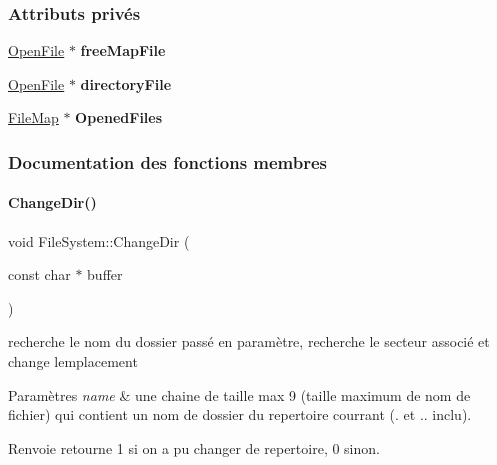 \subsubsection*{Attributs privés}
\begin{DoxyCompactItemize}
\item 
\hypertarget{class_file_system_ac011f3b710a3b03d29fb9e554008699d}{}\label{class_file_system_ac011f3b710a3b03d29fb9e554008699d} 
\hyperlink{class_open_file}{Open\+File} $\ast$ {\bfseries free\+Map\+File}
\item 
\hypertarget{class_file_system_a8d062da5905bf0eca01033ad70d0e2d5}{}\label{class_file_system_a8d062da5905bf0eca01033ad70d0e2d5} 
\hyperlink{class_open_file}{Open\+File} $\ast$ {\bfseries directory\+File}
\item 
\hypertarget{class_file_system_a02aaa8b1bdbe6f73e3058a0ccea2172c}{}\label{class_file_system_a02aaa8b1bdbe6f73e3058a0ccea2172c} 
\hyperlink{class_file_map}{File\+Map} $\ast$ {\bfseries Opened\+Files}
\end{DoxyCompactItemize}


\subsubsection{Documentation des fonctions membres}
\hypertarget{class_file_system_ab60a0afd7904cc1826d6964e4d6025e2}{}\label{class_file_system_ab60a0afd7904cc1826d6964e4d6025e2} 
\paragraph{\texorpdfstring{Change\+Dir()}{ChangeDir()}}
{\footnotesize\ttfamily void File\+System\+::\+Change\+Dir (\begin{DoxyParamCaption}\item[{const char $\ast$}]{buffer }\end{DoxyParamCaption})}



recherche le nom du dossier passé en paramètre, recherche le secteur associé et change l\textquotesingle{}emplacement 


\begin{DoxyParams}{Paramètres}
{\em name} & une chaine de taille max 9 (taille maximum de nom de fichier) qui contient un nom de dossier du repertoire courrant (. et .. inclu). \\
\hline
\end{DoxyParams}
\begin{DoxyReturn}{Renvoie}
retourne 1 si on a pu changer de repertoire, 0 sinon. 
\end{DoxyReturn}


